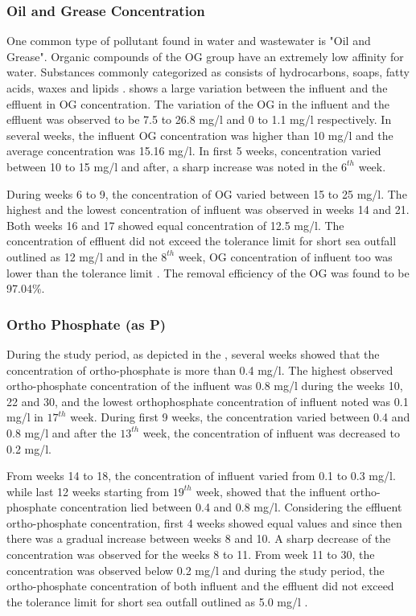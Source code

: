 

\subsubsection{Oil and Grease Concentration}

One common type of pollutant found in water and wastewater is "Oil and Grease". Organic compounds of the \ac{OG} group have an extremely low affinity for water. Substances commonly categorized as consists of hydrocarbons, soaps, fatty acids, waxes and lipids \cite{Pintor2016}.  shows a large variation between the influent and the effluent in \ac{OG} concentration. The variation of the \ac{OG} in the influent and the effluent was observed to be 7.5 to 26.8 mg/l and 0 to 1.1 mg/l respectively. In several weeks, the influent \ac{OG} concentration was higher than 10 mg/l and the average concentration was 15.16 mg/l. In first 5 weeks, concentration varied between 10 to 15 mg/l and after, a sharp increase was noted in the $6^{th}$ week.

During weeks 6 to 9, the concentration of \ac{OG} varied between 15 to 25 mg/l.  The highest and the lowest concentration of influent was observed in weeks 14 and 21. Both weeks 16 and 17 showed equal concentration of 12.5 mg/l. The concentration of effluent did not exceed the tolerance limit for short sea outfall outlined as 12 mg/l and in the $8^{th}$ week, \ac{OG} concentration of influent too was lower than the tolerance limit \cite{CEA2022}. The removal efficiency of the \ac{OG} was found to be 97.04\%.\\




\subsubsection{Ortho Phosphate (as P)}
During the study period, as depicted in the , several weeks showed that the concentration of ortho-phosphate is more than 0.4 mg/l. The highest observed ortho-phosphate concentration of the influent was 0.8 mg/l during the weeks 10, 22 and 30, and the lowest orthophosphate concentration of influent noted was 0.1 mg/l in $17^{th}$ week. During first 9 weeks, the concentration varied between 0.4 and 0.8 mg/l and after the $13^{th}$ week, the concentration of influent was decreased to 0.2 mg/l.

From weeks 14 to 18, the concentration of influent varied from 0.1 to 0.3 mg/l. while last 12 weeks starting from $19^{th}$ week, showed that the influent ortho-phosphate concentration lied between 0.4 and 0.8 mg/l. Considering the effluent ortho-phosphate concentration, first 4 weeks showed equal values and since then there was a gradual increase between weeks 8 and 10. A sharp decrease of the concentration was observed for the weeks 8 to 11. From week 11 to 30, the concentration was observed below 0.2 mg/l and during the study period, the ortho-phosphate concentration of both influent and the effluent did not exceed the tolerance limit for short sea outfall outlined as 5.0 mg/l \cite{CEA2022}. 



